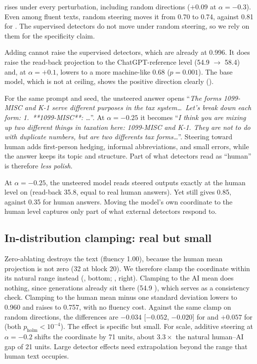  \binoculars rises under every perturbation, including random directions ($+0.09$ at $\alpha=-0.3$). Even among fluent texts, random steering moves it from 0.70 to 0.74, against 0.81 for \dai. The supervised detectors do not move under random steering, so we rely on them for the specificity claim.

 Adding \dai cannot raise the supervised detectors, which are already at 0.996. It does raise the read-back projection to the ChatGPT-reference level (54.9 $\to$ 58.4) and, at $\alpha=+0.1$, lowers \binoculars to a more machine-like 0.68 ($p=0.001$). The base model, which is not at ceiling, shows the positive direction clearly ().

 For the same prompt and seed, the unsteered answer opens ``{\em The forms 1099-MISC and K-1 serve different purposes in the tax system\ldots\ Let's break down each form: 1.\ **1099-MISC**: \ldots}''. At $\alpha=-0.25$ it becomes ``{\em I think you are mixing up two different things in taxation here: 1099-MISC and K-1. They are not to do with duplicate numbers, but are two differents tax forms\ldots}''.
Steering toward human adds first-person hedging, informal abbreviations, and small errors, while the answer keeps its topic and structure. Part of what detectors read as ``human'' is therefore {\em less polish}.

 At $\alpha=-0.25$, the unsteered model reads steered outputs exactly at the human level on \dai (read-back 35.8, equal to real human answers). Yet \desklib still gives 0.85, against 0.35 for human answers. Moving the model's own \dai coordinate to the human level captures only part of what external detectors respond to.

\subsection{In-distribution clamping: real but small}
\label{sec:clamp}



Zero-ablating \dai destroys the text (fluency 1.00), because the human mean projection is not zero (32 at block 20). We therefore clamp the coordinate within its natural range instead (, bottom; , right).
Clamping to the AI mean does nothing, since generations already sit there (54.9 ), which serves as a consistency check. Clamping to the human mean minus one standard deviation lowers \desklib to 0.960 and raises \binoculars to 0.757, with no fluency cost. Against the same clamp on random directions, the differences are $-0.034$ [$-0.052$, $-0.020$] for \desklib and $+0.057$ for \binoculars (both $p_{\text{holm}}<10^{-4}$).
The effect is specific but small. For scale, additive steering at $\alpha=-0.2$ shifts the coordinate by 71 units, about $3.3\times$ the natural human--AI gap of 21 units. Large detector effects need extrapolation beyond the range that human text occupies.

